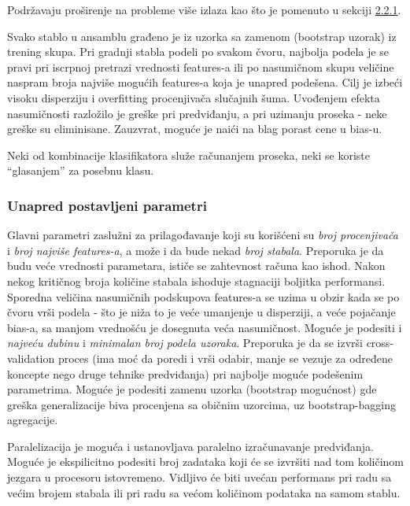 \documentclass[fontsize=12bp, paper=a4]{scrarticle}
\begin{document}
Podržavaju proširenje na probleme više izlaza kao što je pomenuto u sekciji \hyperref[sec:mop]{2.2.1}.

Svako stablo u ansamblu građeno je iz uzorka sa zamenom (bootstrap uzorak) iz trening skupa.
Pri gradnji stabla podeli po svakom čvoru, najbolja podela je se pravi pri iscrpnoj pretrazi vrednosti features-a ili po nasumičnom skupu veličine naspram broja najviše mogućih features-a koja je unapred podešena. Cilj je izbeći visoku disperziju i overfitting procenjivača slučajnih šuma. Uvođenjem efekta nasumičnosti razložilo je greške pri predviđanju, a pri uzimanju proseka - neke greške su eliminisane. Zauzvrat, moguće je naići na blag porast cene u bias-u. 

Neki od kombinacije klasifikatora služe računanjem proseka, neki se koriste ``glasanjem'' za posebnu klasu.

\subsubsection{Unapred postavljeni parametri}
Glavni parametri zaslužni za prilagođavanje koji su korišćeni su \textit{broj procenjivača} i \textit{broj najviše features-a}, a može i da bude nekad \textit{broj stabala}. Preporuka je da budu veće vrednosti parametara, ističe se zahtevnost računa kao ishod. Nakon nekog kritičnog broja količine stabala ishoduje stagnaciji boljitka performansi. Sporedna veličina nasumičnih podskupova features-a se uzima u obzir kada se po čvoru vrši podela - što je niža to je veće umanjenje u disperziji, a veće pojačanje bias-a, sa manjom vrednošću je dosegnuta veća nasumičnost. Moguće je podesiti i \textit{najveću dubinu} i \textit{minimalan broj podela uzoraka}. Preporuka je da se izvrši cross-validation proces (ima moć da poredi i vrši odabir, manje se vezuje za određene koncepte nego druge tehnike predviđanja\cite{cv}) pri najbolje moguće podešenim parametrima. Moguće je podesiti zamenu uzorka (bootstrap mogućnost) gde greška generalizacije biva procenjena sa običnim uzorcima, uz bootstrap-bagging agregacije. 

Paralelizacija je moguća i ustanovljava paralelno izračunavanje predviđanja. Moguće je ekspilicitno podesiti broj zadataka koji će se izvršiti nad tom količinom jezgara u procesoru istovremeno. Vidljivo će biti uvećan performans pri radu sa većim brojem stabala ili pri radu sa većom količinom podataka na samom stablu.
\end{document}
